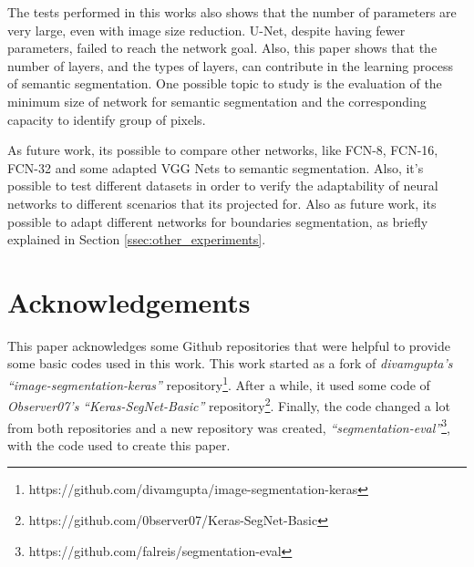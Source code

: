 \documentclass[10pt,twocolumn,letterpaper]{article}
\begin{document}
The tests performed in this works also shows that the number of parameters are very large, even with image size reduction. U-Net, despite having fewer parameters, failed to reach the network goal. Also, this paper shows that the number of layers, and the types of layers, can contribute in the learning process of semantic segmentation. One possible topic to study is the evaluation of the minimum size of network for semantic segmentation and the corresponding capacity to identify group of pixels.

As future work, its possible to compare other networks, like FCN-8, FCN-16, FCN-32 \cite{FULLY_CONVOLU} and some adapted VGG Nets \cite{VGGNET} to semantic segmentation. Also, it's possible to test different datasets in order to verify the adaptability of neural networks to different scenarios that its projected for. Also as future work, its possible to adapt different networks for boundaries segmentation, as briefly explained in Section \ref{ssec:other_experiments}.

\section{Acknowledgements} \label{sec:acknowledgements}

This paper acknowledges some Github repositories that were helpful to provide some basic codes used in this work. This work started as a fork of \textit{divamgupta's} \textit{``image-segmentation-keras''} repository\footnote{https://github.com/divamgupta/image-segmentation-keras}. After a while, it used some code of \textit{Observer07's} \textit{``Keras-SegNet-Basic''} repository\footnote{https://github.com/0bserver07/Keras-SegNet-Basic}. Finally, the code changed a lot from both repositories and a new repository was created, \textit{``segmentation-eval''}\footnote{https://github.com/falreis/segmentation-eval}, with the code used to create this paper.

{\small


}
\end{document}
